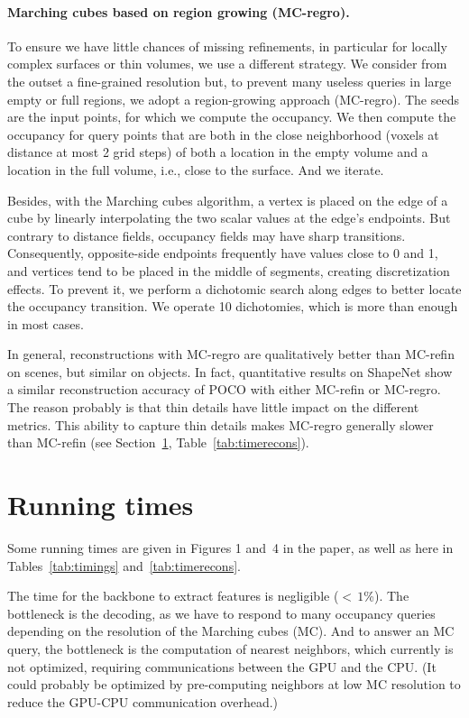 \documentclass[10pt,twocolumn,letterpaper]{article}
\newcommand\OURS{{POCO}}
\begin{document}
\paragraph{Marching cubes based on region growing (MC-regro).}
To ensure we have little chances of missing refinements, in particular for locally complex surfaces or thin volumes, we use a different strategy. We consider from the outset a fine-grained resolution but, to prevent many useless queries in large empty or full regions, we adopt a region-growing approach (MC-regro). The seeds are the input points, for which we compute the occupancy. We then compute the occupancy for query points that are both in the close neighborhood (voxels at distance at most 2 grid steps) of both a location in the empty volume and a location in the full volume, i.e., close to the surface. And we iterate.

Besides, with the Marching cubes algorithm, a vertex is placed on the edge of a cube by linearly interpolating the two scalar values at the edge's endpoints. But contrary to distance fields, occupancy fields may have sharp transitions. Consequently, opposite-side endpoints frequently have values close to 0 and 1, and vertices tend to be placed in the middle of segments, creating discretization effects. To prevent it, we perform a dichotomic search along edges to better locate the occupancy transition.
We operate 10 dichotomies, which is more than enough in most cases.

In general, reconstructions with MC-regro are qualitatively better than MC-refin on scenes, but similar on objects. In fact, quantitative results on ShapeNet show a similar reconstruction accuracy of {\OURS} with either MC-refin or MC-regro. The reason probably is that thin details have little impact on the different metrics. This ability to capture thin details makes MC-regro generally slower than MC-refin (see Section~\ref{sec:runtime}, Table~\ref{tab:timerecons}).

\section{Running times}\label{sec:runtime}
Some running times are given in Figures 1 and~4 in the paper, as well as here in Tables~\ref{tab:timings} and~\ref{tab:timerecons}. 

The time for the backbone to extract features is negligible (${<}\, 1$\%). The bottleneck is the decoding, as we have to respond to many occupancy queries depending on the resolution of the Marching cubes (MC). And to answer an MC query, the bottleneck is the computation of nearest neighbors, which currently is not optimized, requiring communications between the GPU and the CPU. (It could probably be optimized by pre-computing neighbors at low MC resolution to reduce the GPU-CPU communication overhead.)
\end{document}
